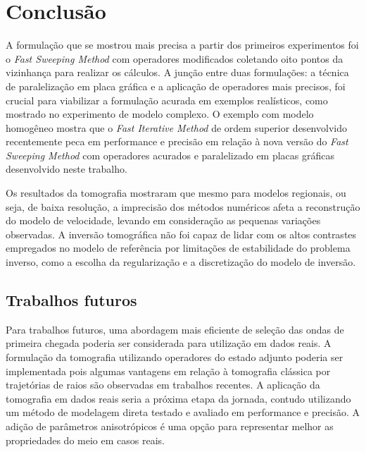 \chapter{Conclusão}
\label{ch:conclusao}

A formulação que se mostrou mais precisa a partir dos primeiros experimentos foi o \textit{Fast Sweeping Method} com operadores modificados coletando oito pontos da vizinhança para realizar os cálculos. A junção entre duas formulações: a técnica de paralelização em placa gráfica e a aplicação de operadores mais precisos, foi crucial para viabilizar a formulação acurada em exemplos realísticos, como mostrado no experimento de modelo complexo. O exemplo com modelo homogêneo mostra que o \textit{Fast Iterative Method} de ordem superior desenvolvido recentemente peca em performance e precisão em relação à nova versão do \textit{Fast Sweeping Method} com operadores acurados e paralelizado em placas gráficas desenvolvido neste trabalho.  

Os resultados da tomografia mostraram que mesmo para modelos regionais, ou seja, de baixa resolução, a imprecisão dos métodos numéricos afeta a reconstrução do modelo de velocidade, levando em consideração as pequenas variações observadas. A inversão tomográfica não foi capaz de lidar com os altos contrastes empregados no modelo de referência por limitações de estabilidade do problema inverso, como a escolha da regularização e a discretização do modelo de inversão. 

\section{Trabalhos futuros}

Para trabalhos futuros, uma abordagem mais eficiente de seleção das ondas de primeira chegada poderia ser considerada para utilização em dados reais. A formulação da tomografia utilizando operadores do estado adjunto poderia ser implementada pois algumas vantagens em relação à tomografia clássica por trajetórias de raios são observadas em trabalhos recentes. A aplicação da tomografia em dados reais seria a próxima etapa da jornada, contudo utilizando um método de modelagem direta testado e avaliado em performance e precisão. A adição de parâmetros anisotrópicos é uma opção para representar melhor as propriedades do meio em casos reais. 

